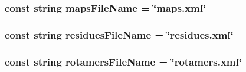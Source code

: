 \subsubsection{\setlength{\rightskip}{0pt plus 5cm}const string {\bf maps\-File\-Name} = \char`\"{}maps.xml\char`\"{}}\label{PInit_8cc_4ebba21a5df7ffa5ca370f573acc87be}


\subsubsection{\setlength{\rightskip}{0pt plus 5cm}const string {\bf residues\-File\-Name} = \char`\"{}residues.xml\char`\"{}}\label{PInit_8cc_42a55006a0631afe93221aa77cd41a2f}


\subsubsection{\setlength{\rightskip}{0pt plus 5cm}const string {\bf rotamers\-File\-Name} = \char`\"{}rotamers.xml\char`\"{}}\label{PInit_8cc_478803c46c1d5df43aba9af22db8436c}


